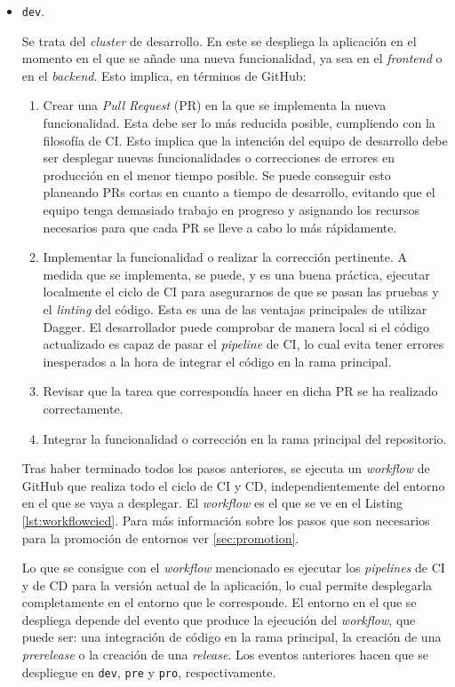 \begin{itemize}
  \item \texttt{dev}.

    Se trata del \textit{cluster} de desarrollo. En este se despliega la aplicación en el momento en el que se añade una nueva funcionalidad, ya sea en el \textit{frontend} o en el \textit{backend}. Esto implica, en términos de GitHub:

    \begin{enumerate}
      \item Crear una \textit{Pull Request} (PR) en la que se implementa la nueva funcionalidad. Esta debe ser lo más reducida posible, cumpliendo con la filosofía de CI. Esto implica que la intención del equipo de desarrollo debe ser desplegar nuevas funcionalidades o correcciones de errores en producción en el menor tiempo posible. Se puede conseguir esto planeando PRs cortas en cuanto a tiempo de desarrollo, evitando que el equipo tenga demasiado trabajo en progreso y asignando los recursos necesarios para que cada PR se lleve a cabo lo más rápidamente\cite{linear}.
      \item Implementar la funcionalidad o realizar la corrección pertinente. A medida que se implementa, se puede, y es una buena práctica, ejecutar localmente el ciclo de CI para asegurarnos de que se pasan las pruebas y el \textit{linting} del código. Esta es una de las ventajas principales de utilizar Dagger. El desarrollador puede comprobar de manera local si el código actualizado es capaz de pasar el \textit{pipeline} de CI, lo cual evita tener errores inesperados a la hora de integrar el código en la rama principal.
      \item Revisar que la tarea que correspondía hacer en dicha PR se ha realizado correctamente.
      \item Integrar la funcionalidad o corrección en la rama principal del repositorio.
    \end{enumerate}

    Tras haber terminado todos los pasos anteriores, se ejecuta un \textit{workflow} de GitHub que realiza todo el ciclo de CI y CD, independientemente del entorno en el que se vaya a desplegar. El \textit{workflow} es el que se ve en el Listing \ref{lst:workflowcicd}. Para más información sobre los pasos que son necesarios para la promoción de entornos ver \ref{sec:promotion}. 

    Lo que se consigue con el \textit{workflow} mencionado es ejecutar los \textit{pipelines} de CI y de CD para la versión actual de la aplicación, lo cual permite desplegarla completamente en el entorno que le corresponde. El entorno en el que se despliega depende del evento que produce la ejecución del \textit{workflow}, que puede ser: una integración de código en la rama principal, la creación de una \textit{prerelease} o la creación de una \textit{release}. Los eventos anteriores hacen que se despliegue en \texttt{dev}, \texttt{pre} y \texttt{pro}, respectivamente.


\end{itemize}
